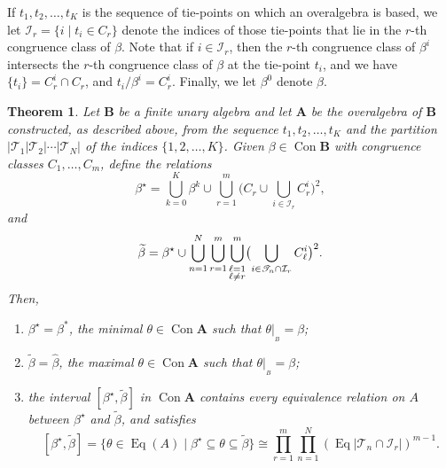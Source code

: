 \documentclass{au}
\numberwithin{equation}{section}
\theoremstyle{plain}
\newtheorem{theorem}{Theorem}[section]
\theoremstyle{definition}
\newcommand{\suchthat}{\ensuremath{\mid}}  %
\newcommand{\<}{\ensuremath{\langle}}
\renewcommand{\>}{\ensuremath{\rangle}}
\newcommand{\bA}{\ensuremath{\mathbf{A}}}
\newcommand{\bB}{\ensuremath{\mathbf{B}}}
\newcommand{\sT}{\ensuremath{\mathscr{T}}}
\newcommand{\sI}{\ensuremath{\mathcal{I}}}
\DeclareMathOperator{\Eq}{Eq}
\DeclareMathOperator{\Con}{Con}
\newcommand{\resB}{\ensuremath{|_{_B}}}
\newcommand{\tbeta}{\ensuremath{\widetilde{\beta}}}
\begin{document}
If $t_1, t_2, \dots, t_K$ is the sequence of tie-points on which an
overalgebra is based,
we let $\sI_r = \{i \mid t_i \in C_r\}$ denote the indices of those
tie-points that lie in the $r$-th congruence class of $\beta$.
Note that if $i\in \sI_r$, then the $r$-th congruence class of
$\beta^i$ intersects the $r$-th congruence class of $\beta$ at the tie-point
$t_i$, and we have $\{t_i\} = C_r^i\cap C_r$, %
and $t_i/\beta^i = C_r^i$.  Finally, %
we let $\beta^{0}$ denote $\beta$.
\begin{theorem}
\label{thm1}
Let $\bB$ be a finite unary algebra and let $\bA$ be the overalgebra of $\bB$ constructed,
as described above, from the sequence $t_1, t_2, \dots, t_K$ and the partition $|\sT_1|\sT_2|
\cdots|\sT_N|$ of the indices $\{1, 2, \dots, K\}$.
Given $\beta \in \Con \bB$ with congruence classes $C_1, \dots, C_m$, define the relations
  \begin{equation}
    \label{eq:star}
\beta^\star= \bigcup_{k=0}^K \beta^{k} \cup \bigcup_{r=1}^m
\bigl(C_r \cup \bigcup_{i\in \sI_r} C_r^i \bigr)^2,
  \end{equation}
and
  \begin{equation}
    \label{eq:betahat}
    \tbeta =
    \beta^\star \cup
    \bigcup_{n=1}^N
    \bigcup_{r=1}^m
    \bigcup^m_{\begin{subarray}{l}\ell=1 \\\ell \neq r \end{subarray}}
    \bigl(\bigcup_{i \in \sT_n \cap \sI_r} C^i_{\ell}\bigr)^2.
  \end{equation}
Then,
\begin{enumerate}[\rm(i)] %
\item
$\beta^\star=\beta^*$, the minimal $\theta\in \Con\bA$ such that $\theta\resB = \beta$;
\item $\tbeta=\widehat{\beta}$, the maximal $\theta \in \Con\bA$ such that $\theta\resB = \beta$;
\item
\label{item-iii}
the interval $[\beta^\star, \tbeta]$ in $\Con\bA$
  contains every equivalence relation on $A$ between $\beta^\star$ and $\tbeta$,
and satisfies
  \begin{equation}
    \label{eq:item-iii}
          [\beta^\star, \tbeta]
          =
          \{\theta \in \Eq(A) \suchthat \beta^\star \subseteq \theta \subseteq \tbeta \}
          \cong \prod_{r=1}^m \prod_{n=1}^N (\Eq |\sT_n \cap \sI_r|)^{m-1}.
  \end{equation}
\end{enumerate}
\end{theorem}
\end{document}

